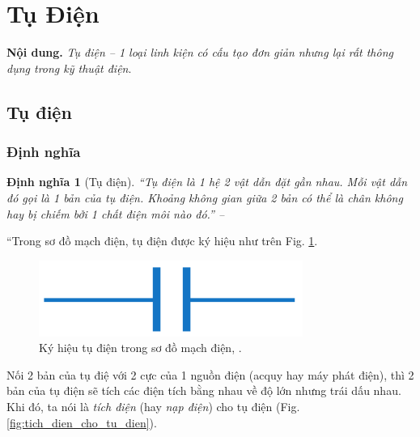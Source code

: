 \documentclass[oneside]{book}
\numberwithin{equation}{section}
\newtheorem{dinhnghia}{Định nghĩa}[section]
\begin{document}

\section{Tụ Điện}
\textbf{Nội dung.} \textit{Tụ điện -- 1 loại linh kiện có cấu tạo đơn giản nhưng lại rất thông dụng trong kỹ thuật điện}.

\subsection{Tụ điện}

\subsubsection{Định nghĩa}

\begin{dinhnghia}[Tụ điện]
	``\emph{Tụ điện} là 1 hệ 2 vật dẫn đặt gần nhau. Mỗi vật dẫn đó gọi là 1 bản của tụ điện. Khoảng không gian giữa 2 bản có thể là chân không hay bị chiếm bởi 1 chất điện môi nào đó.'' -- \cite[p. 32]{SGK_Vat_Ly_11_nang_cao}
\end{dinhnghia}
``Trong sơ đồ mạch điện, tụ điện được ký hiệu như trên Fig. \ref{fig:ky_hieu_tu_dien}.

\begin{figure}[H]
	\centering
	\includegraphics[scale=0.15]{ky_hieu_tu_dien}
	\caption{Ký hiệu tụ điện trong sơ đồ mạch điện, \cite[Hình 7.1, p. 32]{SGK_Vat_Ly_11_nang_cao}.}
	\label{fig:ky_hieu_tu_dien}
\end{figure}
Nối 2 bản của tụ điệ với 2 cực của 1 nguồn điện (acquy hay máy phát điện), thì 2 bản của tụ điện sẽ tích các điện tích bằng nhau về độ lớn nhưng trái dấu nhau. Khi đó, ta nói là \textit{tích điện} (hay \textit{nạp điện}) cho tụ điện (Fig. \ref{fig:tich_dien_cho_tu_dien}).
\end{document}
